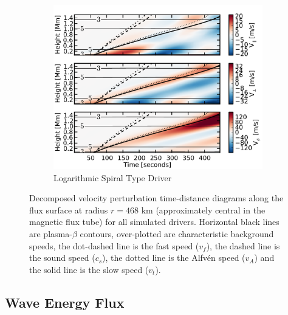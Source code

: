 \begin{figure}
    \begin{subfigure}[b]{0.49\textwidth}
        \includegraphics[width=\columnwidth]{Chapter4/Figs/TD_wave_speeds_Slog_p240_A10_r30_B005.pdf}
        \caption{Logarithmic Spiral Type Driver}
        \label{fig:All_TD_wave_30:Slog}
    \end{subfigure}
    \caption{Decomposed velocity perturbation time-distance diagrams along the flux surface at radius $r = 468$ km (approximately central in the magnetic flux tube) for all simulated drivers. Horizontal black lines are plasma-$\beta$ contours, over-plotted are characteristic background speeds, the dot-dashed line is the fast speed ($v_f$), the dashed line is the sound speed ($c_s$), the dotted line is the Alfv\'en speed ($v_A$) and the solid line is the slow speed ($v_t$).}
    \label{fig:All_TD_wave_30}
\end{figure}

\subsection{Wave Energy Flux}\label{sec:energy_flux}

